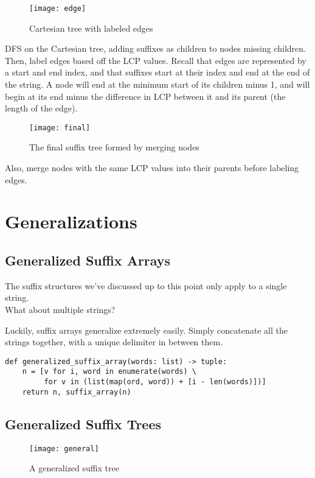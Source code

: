 \documentclass[11pt, oneside]{article}
\begin{document}
\begin{figure}[h!]
\centering
\texttt{[image: edge]}
\caption{Cartesian tree with labeled edges}
\end{figure}

DFS on the Cartesian tree, adding suffixes as children to nodes missing children.
Then, label edges based off the LCP values.
Recall that edges are represented by a start and end index, and that
suffixes start at their index and end at the end of the string.
A node will end at the minimum start of its children minus 1,
and will begin at its end minus the difference in LCP between it and its parent
(the length of the edge).

\begin{figure}[h!]
\centering
\texttt{[image: final]}
\caption{The final suffix tree formed by merging nodes}
\end{figure}

Also, merge nodes with the same LCP values into their parents before labeling edges.

\section{Generalizations}
\subsection{Generalized Suffix Arrays}

The suffix structures we've discussed up to this point only apply to a single string. \\
What about multiple strings?

Luckily, suffix arrays generalize extremely easily.
Simply concatenate all the strings together, with a unique delimiter in between them.

\begin{verbatim}
def generalized_suffix_array(words: list) -> tuple:
    n = [v for i, word in enumerate(words) \
         for v in (list(map(ord, word)) + [i - len(words)])]
    return n, suffix_array(n)
\end{verbatim}

\subsection{Generalized Suffix Trees}

\begin{figure}[h!]
\centering
\texttt{[image: general]}
\caption{A generalized suffix tree}
\end{figure}
\end{document}
